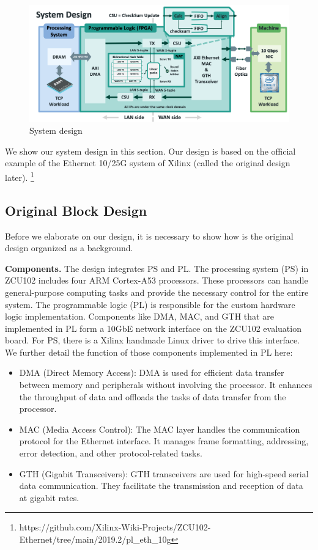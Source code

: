 \begin{figure}[h]
    \centering
    \includegraphics[width=\linewidth]{images/design.png}
    \caption{System design}
    \Description{}
\end{figure}
    We show our system design in this section. Our design is based on the official example of the Ethernet 10/25G system of Xilinx (called the original design later). \footnote{https://github.com/Xilinx-Wiki-Projects/ZCU102-Ethernet/tree/main/2019.2/pl\_eth\_10g}

\subsection{Original Block Design}
    Before we elaborate on our design, it is necessary to show how is the original design organized as a background.

    \textbf{Components.} The design integrates PS and PL. The processing system (PS) in ZCU102 includes four ARM Cortex-A53 processors. These processors can handle general-purpose computing tasks and provide the necessary control for the entire system. The programmable logic (PL) is responsible for the custom hardware logic implementation. 
    Components like DMA, MAC, and GTH that are implemented in PL form a 10GbE network interface on the ZCU102 evaluation board. For PS, there is a Xilinx handmade Linux driver to drive this interface. We further detail the function of those components implemented in PL here:

    \begin{itemize}
    \item {DMA (Direct Memory Access)}: DMA is used for efficient data transfer between memory and peripherals without involving the processor. It enhances the throughput of data and offloads the tasks of data transfer from the processor.
    \item {MAC (Media Access Control)}: The MAC layer handles the communication protocol for the Ethernet interface. It manages frame formatting, addressing, error detection, and other protocol-related tasks.
    \item {GTH (Gigabit Transceivers)}: GTH transceivers are used for high-speed serial data communication. They facilitate the transmission and reception of data at gigabit rates.
    \end{itemize}

